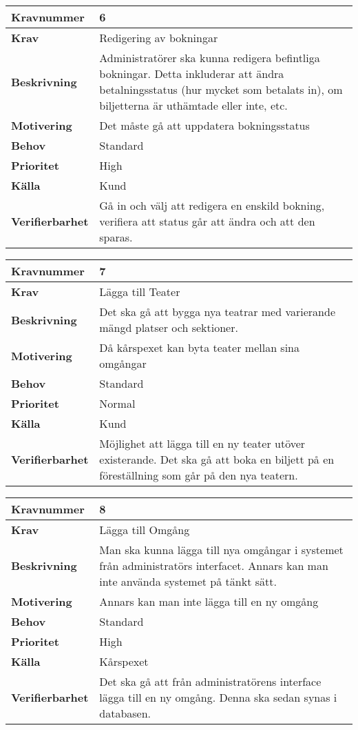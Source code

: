 \documentclass[a4paper, twoside, 11pt, titlepage]{article}
\begin{document}
\begin{tabular} { | p{3cm} | p{12.2cm} | }
	\hline
	\textbf{Kravnummer} & 6  \\
	\hline
	\textbf{Krav} & Redigering av bokningar  \\
	\hline
	\textbf{Beskrivning} & Administratörer ska kunna redigera befintliga bokningar. Detta inkluderar att ändra betalningsstatus (hur mycket som betalats in), om biljetterna är uthämtade eller inte, etc.  \\
	\hline
	\textbf{Motivering} & Det måste gå att uppdatera bokningsstatus  \\
	\hline
	\textbf{Behov} & Standard  \\
	\hline
	\textbf{Prioritet} & High  \\
	\hline
	\textbf{Källa} & Kund  \\
	\hline
	\textbf{Verifierbarhet} & Gå in och välj att redigera en enskild bokning, verifiera att status går att ändra och att den sparas.  \\
	\hline
\end{tabular}

\begin{tabular} { | p{3cm} | p{12.2cm} | }
	\hline
	\textbf{Kravnummer} & 7  \\
	\hline
	\textbf{Krav} & Lägga till Teater  \\
	\hline
	\textbf{Beskrivning} & Det ska gå att bygga nya teatrar med varierande mängd platser och sektioner.   \\
	\hline
	\textbf{Motivering} & Då kårspexet kan byta teater mellan sina omgångar  \\
	\hline
	\textbf{Behov} & Standard  \\
	\hline
	\textbf{Prioritet} & Normal  \\
	\hline
	\textbf{Källa} & Kund  \\
	\hline
	\textbf{Verifierbarhet} & Möjlighet att lägga till en ny teater utöver existerande. Det ska gå att boka en biljett på en föreställning som går på den nya teatern.  \\
	\hline
\end{tabular}

\begin{tabular} { | p{3cm} | p{12.2cm} | }
	\hline
	\textbf{Kravnummer} & 8  \\
	\hline
	\textbf{Krav} & Lägga till Omgång  \\
	\hline
	\textbf{Beskrivning} & Man ska kunna lägga till nya omgångar i systemet från administratörs interfacet. Annars kan man inte använda systemet på tänkt sätt.   \\
	\hline
	\textbf{Motivering} & Annars kan man inte lägga till en ny omgång  \\
	\hline
	\textbf{Behov} & Standard  \\
	\hline
	\textbf{Prioritet} & High  \\
	\hline
	\textbf{Källa} & Kårspexet  \\
	\hline
	\textbf{Verifierbarhet} & Det ska gå att från administratörens interface lägga till en ny omgång. Denna ska sedan synas i databasen.   \\
	\hline
\end{tabular}
\end{document}
